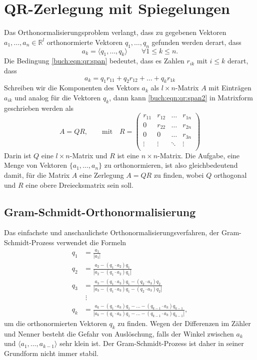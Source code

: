 %
%
%
\section{QR-Zerlegung mit Spiegelungen
\label{buch:section:qr}}
Das Orthonormalisierungsproblem verlangt, dass zu gegebenen Vektoren
$a_1,\dots,a_n\in \mathbb R^l$ orthonormierte Vektoren $q_1,\dots ,q_n$
gefunden werden derart, dass
\begin{equation}
a_k
=
\langle q_1,\dots,q_k \rangle
\qquad
\forall 1\le k\le n.
\label{buch:eqn:qr:span}
\end{equation}
Die Bedingung \eqref{buch:eqn:qr:span} bedeutet, dass es Zahlen $r_{ik}$
mit $i\le k$ derart, dass
\begin{equation}
a_k = q_1 r_{11} +  q_2 r_{12} + \dots + q_k r_{1k}
\label{buch:eqn:qr:span2}
\end{equation}
Schreiben wir die Komponenten des Vektors $a_k$ als $l\times n$-Matrix
$A$ mit Einträgen $a_{ik}$ und analog für die Vektoren $q_k$, dann kann
\eqref{buch:eqn:qr:span2} in Matrixform geschrieben werden als
\[
A=QR, \qquad\text{mit}\quad
R
=
\begin{pmatrix}
r_{11}&r_{12}&\dots &r_{1n}\\
0     &r_{22}&\dots &r_{2n}\\
0     &0     &\dots &r_{3n}\\
\vdots&\vdots&\ddots&\vdots\\
\end{pmatrix}
\]
Darin ist $Q$ eine $l\times n$-Matrix und $R$ ist eine $n\times n$-Matrix.
Die Aufgabe, eine Menge von Vektoren $\{a_1,\dots,a_n\}$ zu orthonormieren,
ist also gleichbedeutend damit, für die Matrix $A$ eine Zerlegung $A=QR$
zu finden, wobei $Q$ orthogonal und $R$ eine obere Dreiecksmatrix sein soll.

%
%
\subsection{Gram-Schmidt-Orthonormalisierung
\label{buch:subsection:gram-schmidt}}
Das einfachste und anschaulichste Orthonormalisierungsverfahren, der
Gram-Schmidt-Prozess verwendet die Formeln
\begin{align*}
q_1 & = \frac{a_1}{|a_1|}
\\
q_2 &= \frac{
a_2 - (q_1\cdot a_2) q_1
}{
|a_2 - (q_1\cdot a_2) q_1|
}
\\
q_3 &= \frac{
a_3 - (q_1\cdot a_3) q_1 - (q_2\cdot a_3) q_2
}{
|a_3 - (q_1\cdot a_3) q_1 - (q_2\cdot a_3) q_2|
}
\\
&\;\vdots\\
q_k
&=\frac{
a_k - (q_1\cdot a_k) q_1 -\dots- (q_{k-1}\cdot a_k) q_{k-1}
}{|
a_k - (q_1\cdot a_k) q_1 -\dots- (q_{k-1}\cdot a_k) q_{k-1}
|},
\end{align*}
um die orthonormierten Vektoren $q_k$ zu finden.
Wegen der Differenzen im Zähler und Nenner besteht die Gefahr von
Auslöschung, falls der Winkel zwischen $a_k$ und
$\langle a_1,\dots,a_{k-1}\rangle$ sehr klein ist.
Der Gram-Schmidt-Prozess ist daher in seiner Grundform nicht immer stabil.

